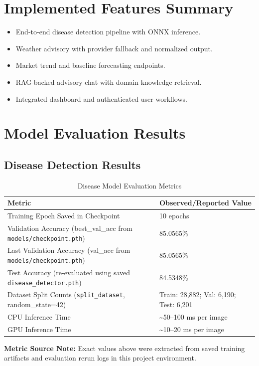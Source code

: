 \documentclass[12pt,a4paper]{report}
\begin{document}
\section{Implemented Features Summary}
\begin{itemize}[noitemsep]
    \item End-to-end disease detection pipeline with ONNX inference.
    \item Weather advisory with provider fallback and normalized output.
    \item Market trend and baseline forecasting endpoints.
    \item RAG-backed advisory chat with domain knowledge retrieval.
    \item Integrated dashboard and authenticated user workflows.
\end{itemize}

\section{Model Evaluation Results}
\subsection{Disease Detection Results}
\begin{table}[H]
\centering
\caption{Disease Model Evaluation Metrics}
\begin{tabular}{p{6.5cm} p{5.5cm}}
\toprule
\textbf{Metric} & \textbf{Observed/Reported Value} \\
\midrule
Training Epoch Saved in Checkpoint & 10 epochs \\
Validation Accuracy (best\_val\_acc from \texttt{models/checkpoint.pth}) & 85.0565\% \\
Last Validation Accuracy (val\_acc from \texttt{models/checkpoint.pth}) & 85.0565\% \\
Test Accuracy (re-evaluated using saved \texttt{disease\_detector.pth}) & 84.5348\% \\
Dataset Split Counts (\texttt{split\_dataset}, random\_state=42) & Train: 28,882; Val: 6,190; Test: 6,201 \\
CPU Inference Time & \textasciitilde50--100 ms per image \\
GPU Inference Time & \textasciitilde10--20 ms per image \\
\bottomrule
\end{tabular}
\end{table}

\textbf{Metric Source Note:} Exact values above were extracted from saved training artifacts and evaluation rerun logs in this project environment.
\end{document}
